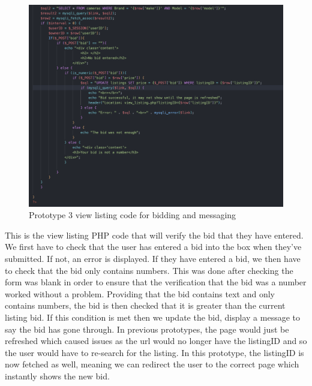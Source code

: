 \begin{figure}[H]
    \centering
    \includegraphics[scale=0.5]{ch3_developing/proto3/view2.png}
    \caption{Prototype 3 view listing code for bidding and messaging}
    \label{fig:proto3_view2}
\end{figure}
This is the view listing PHP code that will verify the bid that they have entered. We first have to check that the user has entered a bid into the box when they’ve submitted. If not, an error is displayed. If they have entered a bid, we then have to check that the bid only contains numbers. This was done after checking the form was blank in order to ensure that the verification that the bid was a number worked without a problem. Providing that the bid contains text and only contains numbers, the bid is then checked that it is greater than the current listing bid. If this condition is met then we update the bid, display a message to say the bid has gone through. In previous prototypes, the page would just be refreshed which caused issues as the url would no longer have the listingID and so the user would have to re-search for the listing. In this prototype, the listingID is now fetched as well, meaning we can redirect the user to the correct page which instantly shows the new bid.

